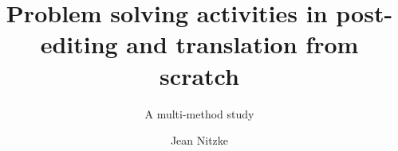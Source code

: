 \author{Jean Nitzke}
\title{Problem solving activities in post-editing and translation from scratch}
\subtitle{A multi-method study}
\renewcommand{\lsSeries}{tmnlp}
\renewcommand{\lsSeriesNumber}{} 
\renewcommand{\lsID}{42} 
